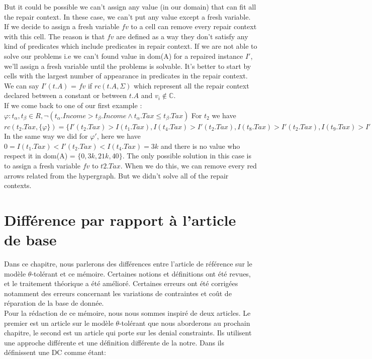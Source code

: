 \documentclass[letterpaper, 12pt]{report}
\theoremstyle{definition}
\begin{document}
But it could be possible we can't assign any value (in our domain) that can fit all the repair context. In these case, we can't put any value except a fresh variable. If we decide to assign a fresh variable $fv$ to a cell can remove every repair context with this cell. The reason is that $fv$ are defined as a way they don't satisfy any kind of predicates which include predicates in repair context. If we are not able to solve our problems i.e we can't found value in dom(A) for a repaired instance $I'$, we'll assign a fresh variable until the problems is solvable. It's better to start by cells with the largest number of appearance in predicates in the repair context. We can say $I'(t.A)$ = $fv$ if $rc(t.A,\Sigma)$ which represent all the repair context declared between a constant or between $t.A$ and $v_i \not\in \mathbb{C}$.\\

If we come back to one of our first example : $\varphi : t_\alpha,t_\beta \in R, \neg(t_\alpha.Income > t_\beta.Income \wedge t_\alpha.Tax \leq t_\beta.Tax)$  For $t_2$ we have $rc(t_2.Tax,\{ \varphi \}) = \{ I'(t_2.Tax) > I(t_1.Tax),I(t_4.Tax) > I'(t_2.Tax),I(t_8.Tax) > I'(t_2.Tax),I(t_9.Tax) > I'(t_2.Tax),I(t_{10}.Tax) > I'(t_2.Tax) \}$ In the same way we did for $\varphi'$, here we have $0 = I(t_1.Tax)< I'(t_2.Tax) < I(t_4.Tax) = 3k$ and there is no value who respect it in dom(A) = $\{ 0,3k,21k,40 \}$. The only possible solution in this case is to assign a fresh variable $fv$ to $t2.Tax$. When we do this, we can remove every red arrows related from the hypergraph. But we didn't solve all of the repair contexts.

\section{Différence par rapport à l'article de base}

Dans ce chapitre, nous parlerons des différences entre l'article de référence sur le modèle $\theta$-tolérant et ce mémoire. Certaines notions et définitions ont été revues, et le traitement théorique a été amélioré. Certaines erreurs ont été corrigées notamment des erreurs concernant les variations de contraintes et coût de réparation de la base de donnée.\\

Pour la rédaction de ce mémoire, nous nous sommes inspiré de deux articles. Le premier est un article sur le modèle $\theta$-tolérant que nous aborderons au prochain chapitre, le second est un article qui porte sur les denial constraints. Ils utilisent une approche différente et une définition différente de la notre. Dans \cite{main,DCs} ils définissent une DC comme étant:
\end{document}
